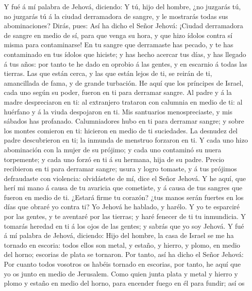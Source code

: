  Y fué á mí palabra de Jehová, diciendo:  Y tú,
hijo del hombre, ¿no juzgarás tú, no juzgarás tú á la ciudad derramadora
de sangre, y le mostrarás todas sus abominaciones?  Dirás,
pues: Así ha dicho el Señor Jehová: ¡Ciudad derramadora de sangre en
medio de sí, para que venga su hora, y que hizo ídolos contra sí misma
para contaminarse!  En tu sangre que derramaste has pecado,
y te has contaminado en tus ídolos que hiciste; y has hecho acercar tus
días, y has llegado á tus años: por tanto te he dado en oprobio á las
gentes, y en escarnio á todas las tierras.  Las que están
cerca, y las que están lejos de ti, se reirán de ti, amancillada de
fama, y de grande turbación.  He aquí que los príncipes de
Israel, cada uno según su poder, fueron en ti para derramar sangre.
 Al padre y á la madre despreciaron en ti: al extranjero
trataron con calumnia en medio de ti: al huérfano y á la viuda
despojaron en ti.  Mis santuarios menospreciaste, y mis
sábados has profanado.  Calumniadores hubo en ti para
derramar sangre; y sobre los montes comieron en ti: hicieron en medio de
ti suciedades.  La desnudez del padre descubrieron en ti;
la inmunda de menstruo forzaron en ti.  Y cada uno hizo
abominación con la mujer de su prójimo; y cada uno contaminó su nuera
torpemente; y cada uno forzó en ti á su hermana, hija de su padre.
 Precio recibieron en ti para derramar sangre; usura y
logro tomaste, y á tus prójimos defraudaste con violencia: olvidástete
de mí, dice el Señor Jehová.  Y he aquí, que herí mi mano á
causa de tu avaricia que cometiste, y á causa de tus sangres que fueron
en medio de ti.  ¿Estará firme tu corazón? ¿tus manos serán
fuertes en los días que obraré yo contra ti? Yo Jehová he hablado, y
harélo.  Y yo te esparciré por las gentes, y te aventaré
por las tierras; y haré fenecer de ti tu inmundicia.  Y
tomarás heredad en ti á los ojos de las gentes; y sabrás que yo soy
Jehová.  Y fué á mí palabra de Jehová, diciendo:
 Hijo del hombre, la casa de Israel se me ha tornado en
escoria: todos ellos son metal, y estaño, y hierro, y plomo, en medio
del horno; escorias de plata se tornaron.  Por tanto, así
ha dicho el Señor Jehová: Por cuanto todos vosotros os habéis tornado en
escorias, por tanto, he aquí que yo os junto en medio de Jerusalem.
 Como quien junta plata y metal y hierro y plomo y estaño
en medio del horno, para encender fuego en él para fundir; así os
